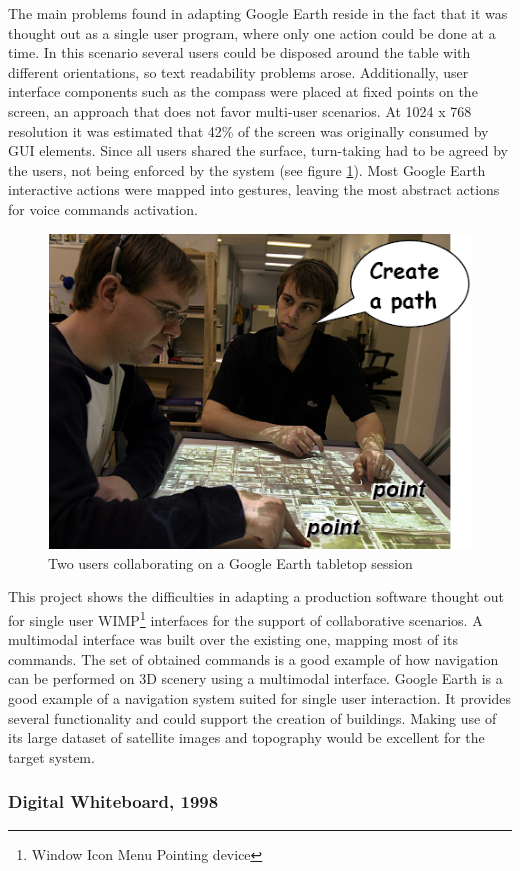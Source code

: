 The main problems found in adapting Google Earth reside in the fact that it was thought out as a single user program,
where only one action could be done at a time.
In this scenario several users could be disposed around the table with different orientations,
so text readability problems arose.
Additionally, user interface components such as the compass were placed at fixed points on the screen,
an approach that does not favor multi-user scenarios.
At 1024 x 768 resolution it was estimated that 42\% of the screen was originally consumed by GUI elements.
Since all users shared the surface, turn-taking had to be agreed by the users,
not being enforced by the system (see figure \ref{FIG-SP-TABLETOP}).
Most Google Earth interactive actions were mapped into gestures,
leaving the most abstract actions for voice commands activation.

\begin{figure}[htb]
		\centering
    \includegraphics[width=0.4\columnwidth]{gfx/sp-gest-ttop.png}
    \caption{Two users collaborating on a Google Earth tabletop session}
    \label{FIG-SP-TABLETOP}
\end{figure}

This project shows the difficulties in adapting a production software thought out
for single user WIMP\footnote{Window Icon Menu Pointing device} interfaces for the support of collaborative scenarios.
A multimodal interface was built over the existing one, mapping most of its commands.
The set of obtained commands is a good example of how navigation can be performed on
3D scenery using a multimodal interface.
Google Earth is a good example of a navigation system suited for single user interaction.
It provides several functionality and could support the creation of buildings.
Making use of its large dataset of satellite images and topography would be excellent
for the target system.



\subsubsection{Digital Whiteboard, 1998}



